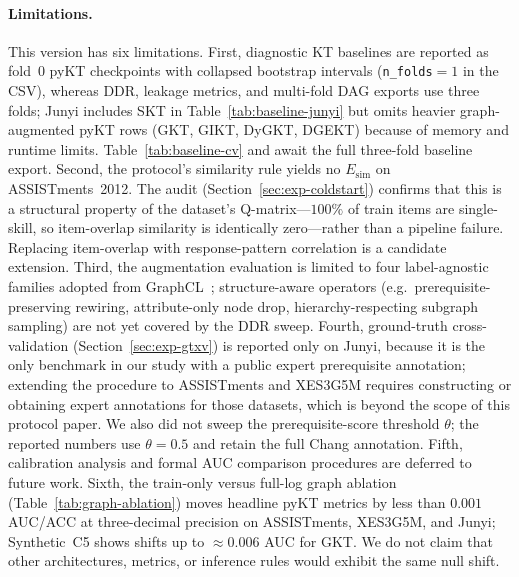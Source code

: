 \documentclass[runningheads]{llncs}
\newcommand{\Esim}{\ensuremath{E_{\text{sim}}}}
\newcommand{\DDR}{\textsc{DDR}}
\begin{document}
\paragraph{Limitations.}
This version has six limitations.
First, diagnostic KT baselines are reported as fold~0 pyKT checkpoints
with collapsed bootstrap intervals (\texttt{n\_folds}${=}1$ in the CSV),
whereas \DDR{}, leakage metrics, and multi-fold DAG exports use three
folds; Junyi includes SKT in Table~\ref{tab:baseline-junyi} but omits
heavier graph-augmented pyKT rows (GKT, GIKT, DyGKT, DGEKT) because of
memory and runtime limits.
Table~\ref{tab:baseline-cv} and 
await the full three-fold baseline export.
Second, the protocol's similarity rule yields no $\Esim$ on
ASSISTments~2012. The audit
(Section~\ref{sec:exp-coldstart}) confirms that this is a structural
property of the dataset's Q-matrix---$100\%$ of train items are
single-skill, so item-overlap similarity is identically zero---rather
than a pipeline failure. Replacing item-overlap with response-pattern
correlation is a candidate extension.
Third, the augmentation evaluation is limited to four label-agnostic
families adopted from GraphCL~\cite{you2020graphcl}; structure-aware
operators (e.g.\ prerequisite-preserving rewiring, attribute-only
node drop, hierarchy-respecting subgraph sampling) are not yet
covered by the \DDR{} sweep.
Fourth, ground-truth cross-validation
(Section~\ref{sec:exp-gtxv}) is reported only on Junyi, because it is
the only benchmark in our study with a public expert prerequisite
annotation; extending the procedure to ASSISTments and XES3G5M
requires constructing or obtaining expert annotations for those
datasets, which is beyond the scope of this protocol paper. We also
did not sweep the prerequisite-score threshold $\theta$; the reported
numbers use $\theta=0.5$ and retain the full Chang annotation.
Fifth, calibration analysis and formal AUC comparison procedures are
deferred to future work.
Sixth, the train-only versus full-log graph ablation
(Table~\ref{tab:graph-ablation}) moves headline pyKT metrics by less than
$0.001$ AUC/ACC at three-decimal precision on ASSISTments, XES3G5M, and
Junyi; Synthetic~C5 shows shifts up to $\approx 0.006$ AUC for GKT. We do not
claim that other architectures, metrics, or inference rules would exhibit the
same null shift.
\end{document}
